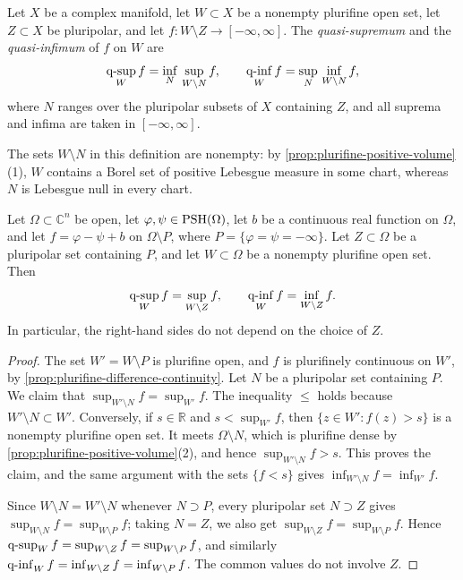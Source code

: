 \begin{definition}\label{def:pluripolar-quasi-extrema}
Let $X$ be a complex manifold, let $W\subset X$ be a nonempty plurifine open set, let $Z\subset X$ be pluripolar, and let $f\colon W\setminus Z\to[-\infty,\infty]$. The \emph{quasi-supremum} and the \emph{quasi-infimum} of $f$ on $W$ are
\[
 \operatorname*{q-sup}_W f
   =\inf_{N}\,\sup_{W\setminus N}f,
 \qquad
 \operatorname*{q-inf}_W f
   =\sup_{N}\,\inf_{W\setminus N}f,
\]
where $N$ ranges over the pluripolar subsets of $X$ containing $Z$, and all suprema and infima are taken in $[-\infty,\infty]$.
\end{definition}

The sets $W\setminus N$ in this definition are nonempty: by \cref{prop:plurifine-positive-volume}(1), $W$ contains a Borel set of positive Lebesgue measure in some chart, whereas $N$ is Lebesgue null in every chart.

\begin{corollary}\label{cor:quasi-extrema-common-poles}
Let $\Omega\subset\mathbb C^n$ be open, let $\varphi,\psi\in\mathrm{PSH}(\Omega)$, let $b$ be a continuous real function on $\Omega$, and let $f=\varphi-\psi+b$ on $\Omega\setminus P$, where $P=\{\varphi=\psi=-\infty\}$. Let $Z\subset\Omega$ be a pluripolar set containing $P$, and let $W\subset\Omega$ be a nonempty plurifine open set. Then
\[
 \operatorname*{q-sup}_W f=\sup_{W\setminus Z}f,
 \qquad
 \operatorname*{q-inf}_W f=\inf_{W\setminus Z}f.
\]
In particular, the right-hand sides do not depend on the choice of $Z$.
\end{corollary}
\begin{proof}
The set $W'=W\setminus P$ is plurifine open, and $f$ is plurifinely continuous on $W'$, by \cref{prop:plurifine-difference-continuity}. Let $N$ be a pluripolar set containing $P$. We claim that $\sup_{W'\setminus N}f=\sup_{W'}f$. The inequality $\le$ holds because $W'\setminus N\subset W'$. Conversely, if $s\in\mathbb R$ and $s<\sup_{W'}f$, then $\{z\in W':f(z)>s\}$ is a nonempty plurifine open set. It meets $\Omega\setminus N$, which is plurifine dense by \cref{prop:plurifine-positive-volume}(2), and hence $\sup_{W'\setminus N}f>s$. This proves the claim, and the same argument with the sets $\{f<s\}$ gives $\inf_{W'\setminus N}f=\inf_{W'}f$.

Since $W\setminus N=W'\setminus N$ whenever $N\supset P$, every pluripolar set $N\supset Z$ gives $\sup_{W\setminus N}f=\sup_{W\setminus P}f$; taking $N=Z$, we also get $\sup_{W\setminus Z}f=\sup_{W\setminus P}f$. Hence $\operatorname*{q-sup}_Wf=\sup_{W\setminus Z}f=\sup_{W\setminus P}f$, and similarly $\operatorname*{q-inf}_Wf=\inf_{W\setminus Z}f=\inf_{W\setminus P}f$. The common values do not involve $Z$.
\end{proof}
